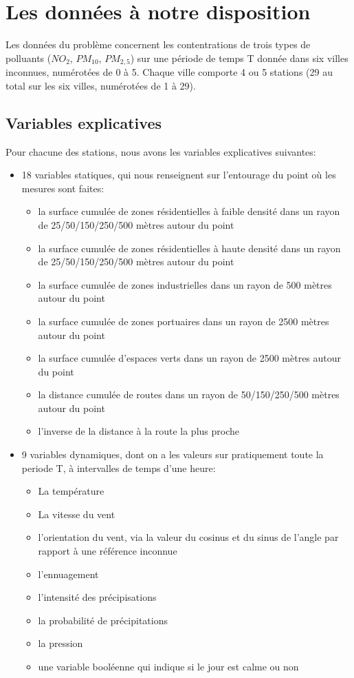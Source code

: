 \section{Les données à notre disposition}

Les données du problème concernent les contentrations de trois types de polluants ($NO_2$, $PM_{10}$, $PM_{2,5}$) sur une période de temps T donnée dans six villes inconnues, numérotées de 0 à 5.
Chaque ville comporte 4 ou 5 stations (29 au total sur les six villes, numérotées de 1 à 29).

\subsection{Variables explicatives}

Pour chacune des stations, nous avons les variables explicatives suivantes:
\begin{itemize}
  \item 18 variables statiques, qui nous renseignent sur l'entourage du point où les mesures sont faites:
  \begin{itemize}
    \item la surface cumulée de zones résidentielles à faible densité dans un rayon de 25/50/150/250/500 mètres autour du point
    \item la surface cumulée de zones résidentielles à haute densité dans un rayon de 25/50/150/250/500 mètres autour du point
    \item la surface cumulée de zones industrielles dans un rayon de 500 mètres autour du point
    \item la surface cumulée de zones portuaires dans un rayon de 2500 mètres autour du point
    \item la surface cumulée d'espaces verts dans un rayon de 2500 mètres autour du point
    \item la distance cumulée de routes dans un rayon de 50/150/250/500 mètres autour du point
    \item l'inverse de la distance à la route la plus proche
  \end{itemize}
  \item 9 variables dynamiques, dont on a les valeurs sur pratiquement toute la periode T, à intervalles de temps d'une heure:
  \begin{itemize}
    \item La température
    \item La vitesse du vent
    \item l'orientation du vent, via la valeur du cosinus et du sinus de l'angle par rapport à une référence inconnue
    \item l'ennuagement
    \item l'intensité des précipisations
    \item la probabilité de précipitations
    \item la pression
    \item une variable booléenne qui indique si le jour est calme ou non
  \end{itemize}
\end{itemize}

